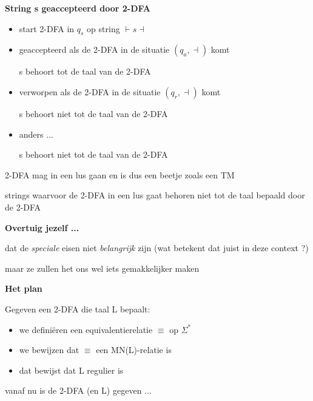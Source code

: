 \documentclass{seminar}
\newcommand{\beginm}{\vdash }
\newcommand{\eindm}{\dashv }
\begin{document}
\begin{slide}

{\bf String s geaccepteerd door 2-DFA}

\begin{itemize}
\item
start 2-DFA in $q_s$ op string $\beginm s\eindm$

\item 
geaccepteerd als de 2-DFA in de situatie $(q_a, \eindm)$ komt

s behoort tot de taal van de 2-DFA
\item 
verworpen als de 2-DFA in de situatie $(q_r, \eindm)$ komt

s behoort niet tot de taal van de 2-DFA

\item 
anders ... 

s behoort niet tot de taal van de 2-DFA

\end{itemize}

2-DFA mag in een lus gaan en is dus een beetje zoals een TM

strings waarvoor de 2-DFA in een lus gaat behoren niet tot de taal
bepaald door de 2-DFA

\end{slide} 

\begin{slide}

{\bf Overtuig jezelf ...}

dat de {\em speciale} eisen niet {\em belangrijk} zijn (wat betekent
dat juist in deze context ?)

maar ze zullen het ons wel iets gemakkelijker maken

\end{slide} 

\begin{slide}

{\bf Het plan}

Gegeven een 2-DFA die taal L bepaalt:

\begin{itemize}
\item 
we defini\"eren een equivalentierelatie $\equiv$ op $\Sigma^*$

\item 
we bewijzen dat $\equiv$ een MN(L)-relatie is

\item 
dat bewijst dat L regulier is

\end{itemize}


vanaf nu is de 2-DFA (en L) gegeven ...

\end{slide} 
\end{document}
